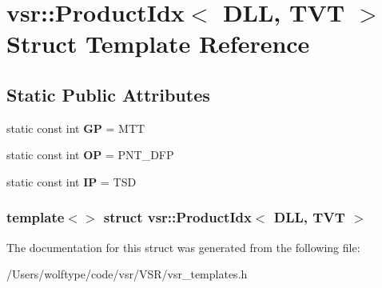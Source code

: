 \hypertarget{structvsr_1_1_product_idx_3_01_d_l_l_00_01_t_v_t_01_4}{\section{vsr\-:\-:Product\-Idx$<$ D\-L\-L, T\-V\-T $>$ Struct Template Reference}
\label{structvsr_1_1_product_idx_3_01_d_l_l_00_01_t_v_t_01_4}
}
\subsection*{Static Public Attributes}
\begin{DoxyCompactItemize}
\item 
\hypertarget{structvsr_1_1_product_idx_3_01_d_l_l_00_01_t_v_t_01_4_a6c930aaf6c3496775612ecc0b2ec91b7}{static const int {\bfseries G\-P} = M\-T\-T}\label{structvsr_1_1_product_idx_3_01_d_l_l_00_01_t_v_t_01_4_a6c930aaf6c3496775612ecc0b2ec91b7}

\item 
\hypertarget{structvsr_1_1_product_idx_3_01_d_l_l_00_01_t_v_t_01_4_a2bf7aea0953b097ce7411927ebe1e314}{static const int {\bfseries O\-P} = P\-N\-T\-\_\-\-D\-F\-P}\label{structvsr_1_1_product_idx_3_01_d_l_l_00_01_t_v_t_01_4_a2bf7aea0953b097ce7411927ebe1e314}

\item 
\hypertarget{structvsr_1_1_product_idx_3_01_d_l_l_00_01_t_v_t_01_4_ac56089b36fe45dc8d45204393ec0871f}{static const int {\bfseries I\-P} = T\-S\-D}\label{structvsr_1_1_product_idx_3_01_d_l_l_00_01_t_v_t_01_4_ac56089b36fe45dc8d45204393ec0871f}

\end{DoxyCompactItemize}
\subsubsection*{template$<$$>$ struct vsr\-::\-Product\-Idx$<$ D\-L\-L, T\-V\-T $>$}



The documentation for this struct was generated from the following file\-:\begin{DoxyCompactItemize}
\item 
/\-Users/wolftype/code/vsr/\-V\-S\-R/vsr\-\_\-templates.\-h\end{DoxyCompactItemize}
